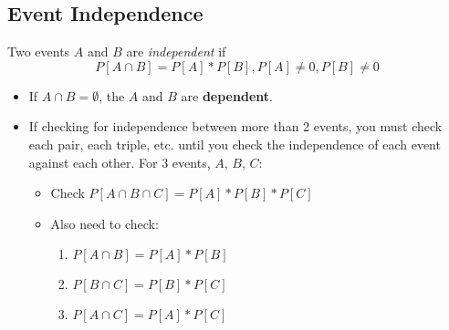 	\subsection{Event Independence} \label{subsec:Event Independence}
		\begin{definition}[Independent] \label{def:Event Independence}
			Two events $A$ and $B$ are \emph{independent} if 
			\begin{equation} \label{eq:Event Independence}
				P \left[ A \cap B \right] = P \left[ A \right] * P \left[ B \right], P\left[ A \right] \neq 0, P\left[ B \right] \neq 0
			\end{equation}
			\begin{itemize}[noitemsep, nolistsep]
				\item If $A \cap B = \emptyset$, the $A$ and $B$ are \textbf{dependent}.
				\item If checking for independence between more than 2 events, you must check each pair, each triple, etc. until you check the independence of each event against each other. For 3 events, $A$, $B$, $C$:
					\begin{itemize}[noitemsep, nolistsep]
						\item Check $P \left[ A \cap B \cap C \right] = P \left[ A \right] * P \left[ B \right] * P \left[ C \right]$
						\item Also need to check:
							\begin{enumerate}
								\item $P \left[ A \cap B \right] = P \left[ A \right] * P \left[ B \right]$
								\item $P \left[ B \cap C \right] = P \left[ B \right] * P \left[ C \right]$
								\item $P \left[ A \cap C \right] = P \left[ A \right] * P \left[ C \right]$
							\end{enumerate}
					\end{itemize}
			\end{itemize}
		\end{definition}